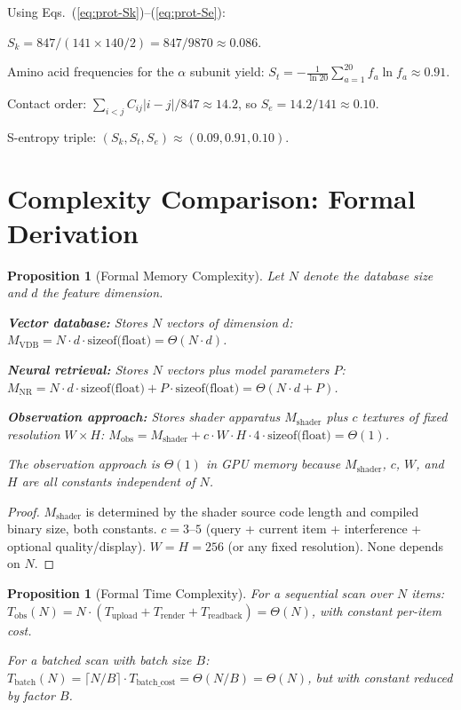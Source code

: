 \documentclass[11pt,twocolumn,a4paper]{article}
\newtheorem{proposition}[theorem]{Proposition}
\newcommand{\Sk}{S_k}
\newcommand{\St}{S_t}
\newcommand{\Se}{S_e}
\newcommand{\Mshader}{M_{\mathrm{shader}}}
\begin{document}
Using Eqs.~(\ref{eq:prot-Sk})--(\ref{eq:prot-Se}):

$\Sk = 847 / (141 \times 140/2) = 847/9870 \approx 0.086$.

Amino acid frequencies for the $\alpha$ subunit yield:
$\St = -\frac{1}{\ln 20} \sum_{a=1}^{20} f_a \ln f_a \approx 0.91$.

Contact order: $\sum_{i<j} C_{ij}|i-j|/847 \approx 14.2$, so
$\Se = 14.2/141 \approx 0.10$.

S-entropy triple: $(\Sk, \St, \Se) \approx (0.09, 0.91, 0.10)$.


\section{Complexity Comparison: Formal Derivation}
\label{app:complexity}

\begin{proposition}[Formal Memory Complexity]
\label{prop:formal-memory}
Let $N$ denote the database size and $d$ the feature dimension.

\textbf{Vector database:}
Stores $N$ vectors of dimension $d$:
$M_{\mathrm{VDB}} = N \cdot d \cdot \text{sizeof(float)}
= \Theta(N \cdot d)$.

\textbf{Neural retrieval:}
Stores $N$ vectors plus model parameters $P$:
$M_{\mathrm{NR}} = N \cdot d \cdot \text{sizeof(float)} + P \cdot
\text{sizeof(float)} = \Theta(N \cdot d + P)$.

\textbf{Observation approach:}
Stores shader apparatus $\Mshader$ plus $c$ textures of fixed
resolution $W \times H$:
$M_{\mathrm{obs}} = \Mshader + c \cdot W \cdot H \cdot 4 \cdot
\text{sizeof(float)} = \Theta(1)$.

The observation approach is $\Theta(1)$ in GPU memory because
$\Mshader$, $c$, $W$, and $H$ are all constants independent of $N$.
\end{proposition}

\begin{proof}
$\Mshader$ is determined by the shader source code length and
compiled binary size, both constants. $c = 3$--$5$ (query +
current item + interference + optional quality/display). $W = H = 256$
(or any fixed resolution). None depends on $N$.
\end{proof}

\begin{proposition}[Formal Time Complexity]
\label{prop:formal-time}
For a sequential scan over $N$ items:
$T_{\mathrm{obs}}(N) = N \cdot (T_{\mathrm{upload}} +
T_{\mathrm{render}} + T_{\mathrm{readback}}) = \Theta(N)$,
with constant per-item cost.

For a batched scan with batch size $B$:
$T_{\mathrm{batch}}(N) = \lceil N/B \rceil \cdot T_{\mathrm{batch\_cost}}
= \Theta(N/B) = \Theta(N)$, but with constant reduced by factor $B$.
\end{proposition}
\end{document}
